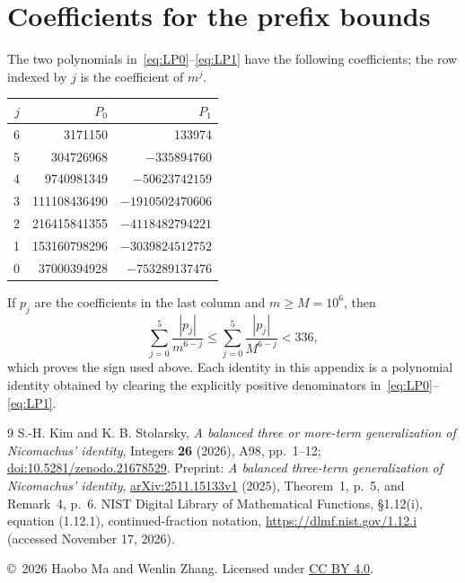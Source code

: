 \documentclass[11pt]{article}
\begin{document}
\appendix
\section{Coefficients for the prefix bounds}\label{app:signs}
The two polynomials in~\eqref{eq:LP0}--\eqref{eq:LP1} have the following
coefficients; the row indexed by $j$ is the coefficient of $m^j$.
\begin{center}
\begin{tabular}{@{}rrr@{}}
\toprule
$j$ & $P_0$ & $P_1$ \\
\midrule
6 & 3171150 & 133974 \\
5 & 304726968 & $-335894760$ \\
4 & 9740981349 & $-50623742159$ \\
3 & 111108436490 & $-1910502470606$ \\
2 & 216415841355 & $-4118482794221$ \\
1 & 153160798296 & $-3039824512752$ \\
0 & 37000394928 & $-753289137476$ \\
\bottomrule
\end{tabular}
\end{center}
If $p_j$ are the coefficients in the last column and $m\ge M=10^6$,
then
\[
 \sum_{j=0}^{5}\frac{|p_j|}{m^{6-j}}
 \le\sum_{j=0}^{5}\frac{|p_j|}{M^{6-j}}<336,
\]
which proves the sign used above. Each identity in this appendix is a
polynomial identity obtained by clearing the explicitly positive denominators
in~\eqref{eq:LP0}--\eqref{eq:LP1}.

\begin{thebibliography}{9}
 S.-H. Kim and K. B. Stolarsky,
\emph{A balanced three or more-term generalization of Nicomachus' identity},
Integers \textbf{26} (2026), A98, pp.~1--12;
\href{https://doi.org/10.5281/zenodo.21678529}{doi:10.5281/zenodo.21678529}.
Preprint: \emph{A balanced three-term generalization of Nicomachus' identity},
\href{https://arxiv.org/abs/2511.15133v1}{arXiv:2511.15133v1} (2025),
Theorem~1, p.~5, and Remark~4, p.~6.
 NIST Digital Library of Mathematical Functions,
\S1.12(i), equation (1.12.1), continued-fraction notation,
\url{https://dlmf.nist.gov/1.12.i} (accessed November 17, 2026).
\end{thebibliography}
\noindent\small\copyright\ 2026 Haobo Ma and Wenlin Zhang.
Licensed under \href{https://creativecommons.org/licenses/by/4.0/}{CC BY 4.0}.
\end{document}
